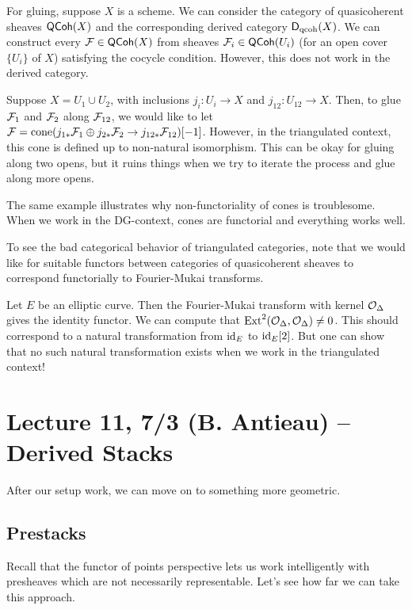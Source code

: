 \documentclass{amsart}
\begin{document}
For gluing, suppose $X$ is a scheme.
We can consider the category of quasicoherent sheaves $\mathsf{QCoh}(X)$ and the corresponding derived category $\mathsf{D}_{\mathrm{qcoh}}(X)$.
We can construct every $\mathcal{F} \in \mathsf{QCoh}(X)$ from sheaves $\mathcal{F}_i \in \mathsf{QCoh}(U_i)$ (for an open cover $\{ U_i \}$ of $X$) satisfying the cocycle condition.
However, this does not work in the derived category.

\begin{ex}
	Suppose $X = U_1 \cup U_2$, with inclusions $j_i: U_i \to X$ and $j_{12}: U_{12} \to X$.
	Then, to glue $\mathcal{F}_1$ and $\mathcal{F}_2$ along $\mathcal{F}_{12}$, we would like to let $\mathcal{F} = \operatorname{cone}(j_{1*} \mathcal{F}_1 \oplus j_{2*} \mathcal{F}_2 \to j_{12*} \mathcal{F}_{12})[-1]$.
	However, in the triangulated context, this cone is defined up to non-natural isomorphism.
	This can be okay for gluing along two opens, but it ruins things when we try to iterate the process and glue along more opens.
\end{ex}

The same example illustrates why non-functoriality of cones is troublesome.
When we work in the DG-context, cones are functorial and everything works well.

To see the bad categorical behavior of triangulated categories, note that we would like for suitable functors between categories of quasicoherent sheaves to correspond functorially to Fourier-Mukai transforms.

\begin{ex}
	Let $E$ be an elliptic curve.
	Then the Fourier-Mukai transform with kernel $\mathcal{O}_\Delta$ gives the identity functor.
	We can compute that $\operatorname{Ext}^2(\mathcal{O}_\Delta, \mathcal{O}_\Delta) \neq 0$.
	This should correspond to a natural transformation from $\operatorname{id}_E$ to $\operatorname{id}_E[2]$.
	But one can show that no such natural transformation exists when we work in the triangulated context!
\end{ex}

\section{Lecture 11, 7/3 (B. Antieau) -- Derived Stacks} 

After our setup work, we can move on to something more geometric.

\subsection{Prestacks}

Recall that the functor of points perspective lets us work intelligently with presheaves which are not necessarily representable.
Let's see how far we can take this approach.
\end{document}
